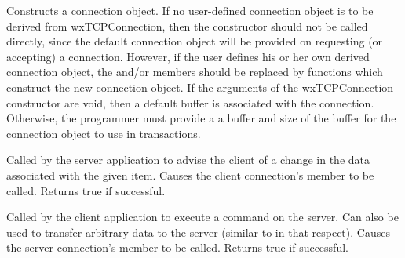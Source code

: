 
\label{wxtcpconnectionctor}



Constructs a connection object. If no user-defined connection object is
to be derived from wxTCPConnection, then the constructor should not be
called directly, since the default connection object will be provided on
requesting (or accepting) a connection. However, if the user defines his
or her own derived connection object, the \rtfsp
and/or  members should be replaced by
functions which construct the new connection object. If the arguments of
the wxTCPConnection constructor are void, then a default buffer is
associated with the connection. Otherwise, the programmer must provide a
a buffer and size of the buffer for the connection object to use in
transactions.

\label{wxtcpconnectionadvise}


Called by the server application to advise the client of a change in
the data associated with the given item. Causes the client
connection's  
member to be called. Returns true if successful.

\label{wxtcpconnectionexecute}


Called by the client application to execute a command on the server. Can
also be used to transfer arbitrary data to the server (similar
to  in that respect). Causes the
server connection's  member to be
called. Returns true if successful.

\label{wxtcpconnectiondisconnect}

